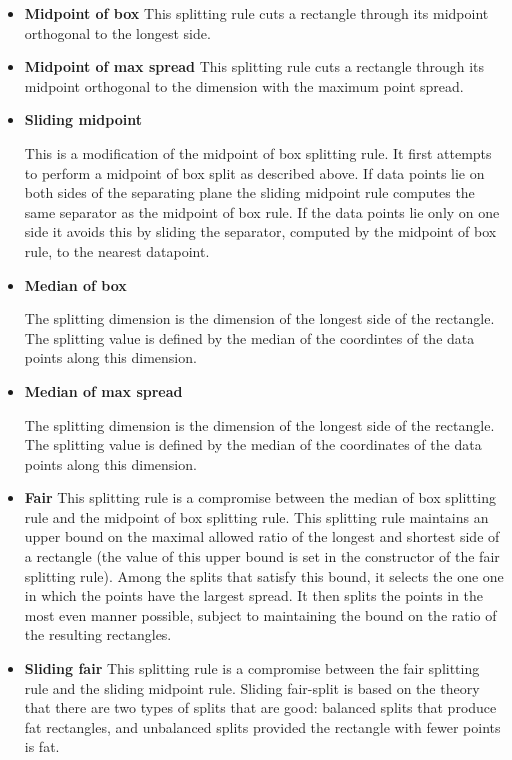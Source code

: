 \begin{itemize}

\item {\bf Midpoint of box}
This splitting rule cuts a rectangle through its midpoint orthogonal
to the longest side.

\item {\bf Midpoint of max spread}
This splitting rule cuts a rectangle through its midpoint orthogonal
to the dimension with the maximum point spread.

\item {\bf Sliding midpoint}

This is a modification of the midpoint of box splitting rule.
It first attempts to perform a midpoint of box split as
described above. If data points lie on both sides of the separating
plane the sliding midpoint rule computes the same separator as
the midpoint of box rule. If the data points lie only on one
side it avoids this by sliding the separator, computed by
the midpoint of box rule, to the nearest datapoint.

\item {\bf Median of box}

The splitting dimension is the dimension of the longest side of the rectangle.
The splitting value is defined by the median of the coordintes of the data points
along this dimension.

\item {\bf Median of max spread}

The splitting dimension is the dimension of the longest side of the rectangle.
The splitting value is defined by the median of the coordinates of the data points
along this dimension.

\item {\bf Fair}
This splitting rule is a compromise between the median of box splitting rule
and the midpoint of box splitting rule. This splitting rule maintains an upper
bound on the maximal allowed ratio of the longest and shortest side of
a rectangle (the value of this upper bound is set in the constructor of the
fair splitting rule). Among the splits that satisfy this bound, it selects
the one one in which the points have the largest spread.
It then splits the points in the most even manner possible, subject
to maintaining the bound on the ratio of the resulting rectangles.

\item {\bf Sliding fair}
This splitting rule is a compromise between the fair splitting rule
and the sliding midpoint rule.
Sliding fair-split is based on the theory that there are
two types of splits that are good: balanced splits that
produce fat rectangles, and unbalanced splits provided
the rectangle with fewer points is fat.


\end{itemize}

